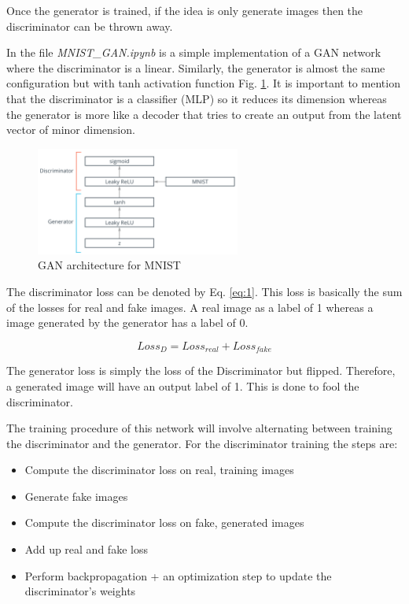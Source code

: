 \documentclass{article}
\begin{document}
Once the generator is trained, if the idea is only generate images then the discriminator can be thrown away. 

In the file \textit{MNIST\_GAN.ipynb} is a simple implementation of a GAN network where the discriminator is a linear. Similarly, the generator is almost the same configuration but with tanh activation function Fig. \ref{fig:f3}. It is important to mention that the discriminator is a classifier (MLP) so it reduces its dimension whereas the generator is more like a decoder that tries to create an output from the latent vector of minor dimension.

\begin{figure}[ht]
    \centering
    \includegraphics[width=0.6\textwidth,height=0.6\textheight,keepaspectratio]{images/simple_mnist.png}
    \captionsetup{justification=centering}
    \caption{GAN architecture for MNIST}
    \label{fig:f3}
\end{figure}

The discriminator loss can be denoted by Eq. \eqref{eq:1}. This loss is basically the sum of the losses for real and fake images. A real image as a label of 1 whereas a image generated by the generator has a label of 0.

\begin{equation}
Loss_D = Loss_{real} + Loss_{fake}
\label{eq:1}
\end{equation}

The generator loss is simply the loss of the Discriminator but flipped. Therefore, a generated image will have an output label of 1. This is done to fool the discriminator.

The training procedure of this network will involve alternating between training the discriminator and the generator. For the discriminator training the steps are:

\begin{itemize}
    \item Compute the discriminator loss on real, training images
    \item Generate fake images
    \item Compute the discriminator loss on fake, generated images
    \item Add up real and fake loss
    \item Perform backpropagation + an optimization step to update the discriminator's weights
\end{itemize}
\end{document}
